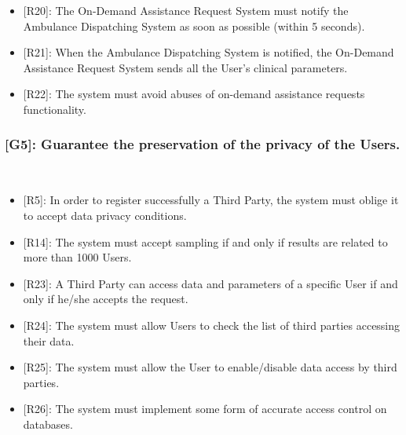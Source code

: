 \documentclass[12pt,a4paper]{article}
\begin{document}
\begin{itemize}
\begin{itemize}
				\\ \\
				\item {[R20]}: The On-Demand Assistance Request System must notify the Ambulance Dispatching System as soon as possible (within 5 seconds).
				\item {[R21]}: When the Ambulance Dispatching System is notified, the On-Demand Assistance Request System sends all the User's clinical parameters.
				\item {[R22]}: The system must avoid abuses of on-demand assistance requests functionality.
			\end{itemize}
		\end{itemize}
	
	\subsubsection*{{[}{G5}{]}: Guarantee the preservation of the privacy of the Users.}
	\begin{itemize}\\
		\begin{itemize}
			\item {[R5]}: In order to register successfully a Third Party, the system must oblige it to accept data privacy conditions.
			\item {[R14]}: The system must accept sampling if and only if results are related to more than 1000 Users.
			\item {[R23]}: A Third Party can access data and parameters of a specific User if and only if he/she accepts the request.
			\item {[R24]}: The system must allow Users to check the list of third parties accessing their data.
			\item {[R25]}: The system must allow the User to enable/disable data access by third parties.
			\item {[R26]}: The system must implement some form of accurate access control on databases.
		\end{itemize}
	\end{itemize}
\end{document}
